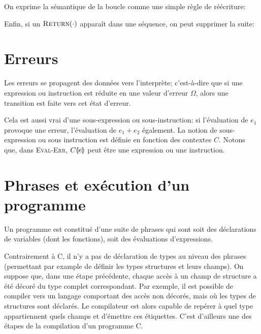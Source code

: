 \begin{mathpar}

\end{mathpar}

On exprime la sémantique de la boucle comme une simple règle de réécriture:

\begin{mathpar}
\end{mathpar}

Enfin, si un $\phx\iReturn$ apparaît dans une séquence, on peut supprimer la suite:

\begin{mathpar}
\end{mathpar}

\section{Erreurs}
\label{sec:eval-errors}

Les erreurs se propagent des données vers l'interprète; c'est-à-dire que si
une expression ou instruction est réduite en une valeur d'erreur $Ω$, alors une
transition est faite vers cet état d'erreur.

Cela est aussi vrai d'une sous-expression ou sous-instruction: si l'évaluation
de $e_1$ provoque une erreur, l'évaluation de $e_1 + e_2$ également. La notion
de sous-expression ou sous instruction est définie en fonction des contextes
$C$. Notons que, dans \textsc{Eval-Err}, $\ctxSub{C}{e}$ peut être une expression
ou une instruction.

\begin{mathpar}

\end{mathpar}

\section{Phrases et exécution d'un programme}

Un programme est constitué d'une suite de phrases qui sont soit des déclarations
de variables (dont les fonctions), soit des évaluations d'expressions.

Contrairement à C, il n'y a pas de déclaration de types au niveau des phrases
(permettant par example de définir les types structures et leurs champs). On
suppose que, dans une étape précédente, chaque accès à un champ de structure a
été décoré du type complet correspondant. Par exemple, il est possible de
compiler vers \langname un langage comportant des accès non décorés, mais où les
types de structures sont déclarés. Le compilateur est alors capable de repérer à
quel type appartiennent quels champs et d'émettre ces étiquettes. C'est d'ailleurs
une des étapes de la compilation d'un programme C.

